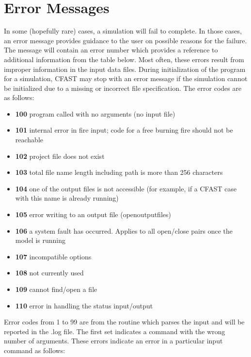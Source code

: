 \newpage

\section{Error Messages}

In some (hopefully rare) cases, a simulation will fail to complete. In those cases, an error message provides guidance to the user on possible reasons for the failure. The message will contain an error number which provides a reference to additional information from the table below. Most often, these errors result from improper information in the input data files.
During initialization of the program for a simulation, CFAST may stop with an error message if the simulation cannot be initialized due to a missing or incorrect file specification. The error codes are as follows:

\begin{itemize}
\item \textbf{100} program called with no arguments (no input file)
\item \textbf{101} internal error in fire input; code for a free burning fire should not be reachable
\item \textbf{102} project file does not exist
\item \textbf{103} total file name length including path  is more than 256 characters
\item \textbf{104} one of the output files is not accessible (for example, if a CFAST case with this name is already running)
\item \textbf{105} error writing to an output file (openoutputfiles)
\item \textbf{106} a system fault has occurred. Applies to all open/close pairs once the model is running
\item \textbf{107} incompatible options
\item \textbf{108} not currently used
\item \textbf{109} cannot find/open a file
\item \textbf{110} error in handling the status input/output
\end{itemize}

Error codes from 1 to 99 are from the routine which parses the input and will be reported in the .log file.  The first set indicates a command with the wrong number of arguments. These errors indicate an error in a particular input command as follows:


